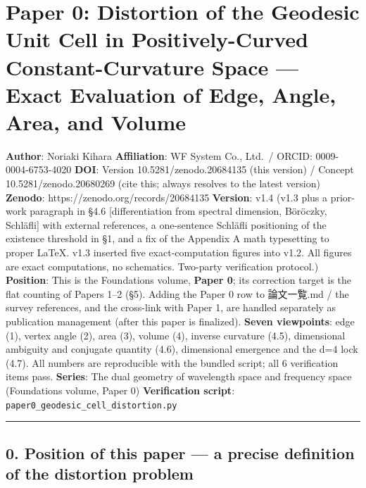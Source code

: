 \documentclass[
]{ltjsarticle}
\author{}
\date{}
\begin{document}
\section{Paper 0: Distortion of the Geodesic Unit Cell in
Positively-Curved Constant-Curvature Space --- Exact Evaluation of Edge,
Angle, Area, and
Volume}\label{paper-0-distortion-of-the-geodesic-unit-cell-in-positively-curved-constant-curvature-space-exact-evaluation-of-edge-angle-area-and-volume}

\textbf{Author}: Noriaki Kihara \textbf{Affiliation}: WF System Co.,
Ltd.~/ ORCID: 0009-0004-6753-4020 \textbf{DOI}: Version
10.5281/zenodo.20684135 (this version) / Concept 10.5281/zenodo.20680269
(cite this; always resolves to the latest version) \textbf{Zenodo}:
https://zenodo.org/records/20684135 \textbf{Version}: v1.4 (v1.3 plus a
prior-work paragraph in §4.6 {[}differentiation from spectral dimension,
Böröczky, Schläfli{]} with external references, a one-sentence Schläfli
positioning of the existence threshold in §1, and a fix of the Appendix
A math typesetting to proper LaTeX. v1.3 inserted five exact-computation
figures into v1.2. All figures are exact computations, no schematics.
Two-party verification protocol.) \textbf{Position}: This is the
Foundations volume, \textbf{Paper 0}; its correction target is the flat
counting of Papers 1--2 (§5). Adding the Paper 0 row to 論文一覧.md /
the survey references, and the cross-link with Paper 1, are handled
separately as publication management (after this paper is finalized).
\textbf{Seven viewpoints}: edge (1), vertex angle (2), area (3), volume
(4), inverse curvature (4.5), dimensional ambiguity and conjugate
quantity (4.6), dimensional emergence and the d=4 lock (4.7). All
numbers are reproducible with the bundled script; all 6 verification
items pass. \textbf{Series}: The dual geometry of wavelength space and
frequency space (Foundations volume, Paper 0) \textbf{Verification
script}: \texttt{paper0\_geodesic\_cell\_distortion.py}

\begin{center}\rule{0.5\linewidth}{0.5pt}\end{center}

\subsection{0. Position of this paper --- a precise definition of the
distortion
problem}\label{position-of-this-paper-a-precise-definition-of-the-distortion-problem}
\end{document}
